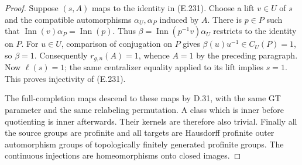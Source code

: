 \begin{proof}
Suppose $(s,A)$ maps to the identity in (E.231).
Choose a lift $v\in U$ of $s$ and the compatible
automorphisms $\alpha_U,\alpha_P$ induced by $A$.
There is $p\in P$ such that
$\operatorname{Inn}(v)\alpha_P=\operatorname{Inn}(p)$.
Thus $\beta=\operatorname{Inn}(p^{-1}v)\alpha_U$
restricts to the identity on $P$.
For $u\in U$, comparison of conjugation on $P$ gives
$\beta(u)u^{-1}\in C_U(P)=1$, so $\beta=1$.
Consequently $r_{g,n}(A)=1$, whence $A=1$ by the
preceding paragraph.  Now $\ell(s)=1$; the same
centralizer equality applied to its lift implies
$s=1$.  This proves injectivity of (E.231).

The full-completion maps descend to these maps by D.31,
with the same GT parameter and the same relabeling
permutation.  A class which is inner before quotienting
is inner afterwards.  Their kernels are therefore also
trivial.  Finally all the source groups are profinite
and all targets are Hausdorff profinite outer
automorphism groups of topologically finitely generated
profinite groups.  The continuous injections are
homeomorphisms onto closed images.
\end{proof}
